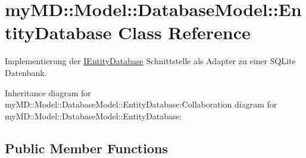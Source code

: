 \hypertarget{classmy_m_d_1_1_model_1_1_database_model_1_1_entity_database}{
\section{my\-MD::Model::Database\-Model::Entity\-Database Class Reference}
\label{dd/d77/classmy_m_d_1_1_model_1_1_database_model_1_1_entity_database}
}
Implementierung der \hyperlink{interfacemy_m_d_1_1_model_1_1_database_model_1_1_i_entity_database}{IEntity\-Database} Schnittstelle als Adapter zu einer SQLite Datenbank.  


Inheritance diagram for my\-MD::Model::Database\-Model::Entity\-Database:Collaboration diagram for my\-MD::Model::Database\-Model::Entity\-Database:\subsection*{Public Member Functions}
